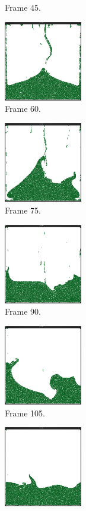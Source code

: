 \begin{figure}[ht!]
\begin{subfigure}[]{0.3\textwidth}
\caption{Frame 45.}
\end{subfigure}
\begin{subfigure}[]{0.3\textwidth}
\includegraphics[height=35mm]{png/pcg4.png}
\caption{Frame 60.}
\end{subfigure}
\begin{subfigure}[]{0.3\textwidth}
\includegraphics[height=35mm]{png/pcg5.png}
\caption{Frame 75.}
\end{subfigure}
\begin{subfigure}[]{0.3\textwidth}
\includegraphics[height=35mm]{png/pcg6.png}
\caption{Frame 90.}
\end{subfigure}
\begin{subfigure}[]{0.3\textwidth}
\includegraphics[height=35mm]{png/pcg7.png}
\caption{Frame 105.}
\end{subfigure}
\begin{subfigure}[]{0.3\textwidth}
\includegraphics[height=35mm]{png/pcg8.png}

\end{subfigure}
\end{figure}
